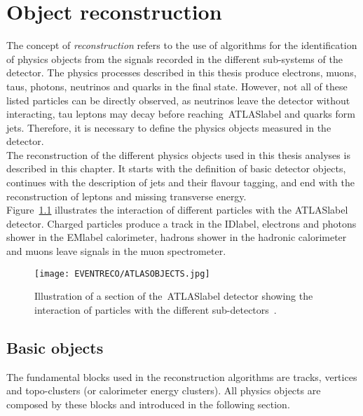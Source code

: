 \chapter{Object reconstruction}
\label{chapter:EventReco}

The concept of \textit{reconstruction} refers to the use of algorithms for the identification of physics objects from the signals recorded in the different sub-systems of the detector. The physics processes described in this thesis produce electrons, muons, taus, photons, neutrinos and quarks in the final state. However, not all of these listed particles can be directly observed, as neutrinos leave the detector without interacting, tau leptons may decay before reaching~\acrshort{ATLASlabel} and quarks form jets. Therefore, it is necessary to define the physics objects measured in the detector.\\

The reconstruction of the different physics objects used in this thesis analyses is described in this chapter. It starts with the definition of basic detector objects, continues with the description of jets and their flavour tagging, and end with the reconstruction of leptons and missing transverse energy.\\

Figure~\ref{figEVNTRECO:ATLASOBJECTS} illustrates the interaction of different particles with the \acrshort{ATLASlabel} detector. Charged particles produce a track in the \acrshort{IDlabel}, electrons and photons shower in the \acrshort{EMlabel} calorimeter, hadrons shower in the hadronic calorimeter and muons leave signals in the muon spectrometer.

\begin{figure}[htbp]
     \RawFloats
     \begin{center}
     \texttt{[image: EVENTRECO/ATLASOBJECTS.jpg]}
     \caption{
         Illustration of a section of the~\acrshort{ATLASlabel} detector showing the interaction of particles with the different sub-detectors~\cite{Pequenao:1505342}. 
     }
     \label{figEVNTRECO:ATLASOBJECTS}
     \end{center}
 \end{figure}

\clearpage

\section{Basic objects}

The fundamental blocks used in the reconstruction algorithms are tracks, vertices and topo-clusters (or calorimeter energy clusters). All physics objects are composed by these blocks and introduced in the following section.


